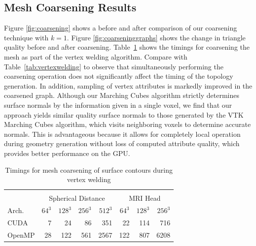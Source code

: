\documentclass[10pt,journal,cspaper,compsoc]{IEEEtran}
\begin{document}
\subsection{Mesh Coarsening Results}
Figure \ref{fig:coarsening} shows a before and after comparison of our coarsening technique with $k=1$. 
Figure \ref{fig:coarseninggraphs} shows the change in triangle quality before and after coarsening.
Table~\ref{tab:timingscoarsening} shows the timings for coarsening the mesh as part of the vertex welding algorithm. Compare with Table~\ref{tab:vertexwelding} to observe that simultaneously performing the coarsening operation does not significantly affect the timing of the topology generation. In addition, sampling of vertex attributes is markedly improved in the coarsened graph. Although our Marching Cubes algorithm strictly determines surface normals by the information given in a single voxel, we find that our approach yields similar quality surface normals to those generated by the VTK Marching Cubes algorithm, which visits neighboring voxels to determine accurate normals. This is advantageous because it allows for completely local operation during geometry generation without loss of computed attribute quality, which provides better performance on the GPU.

\begin{table}[htb!]
\begin{center}
\caption{Timings for mesh coarsening of surface contours during vertex welding}
\label{tab:timingscoarsening}
\begin{tabular}{l|r r r r|r r r}
\multicolumn{8}{c}{ } \\
 & \multicolumn{4}{|c|}{Spherical Distance} & \multicolumn{3}{|c}{MRI Head}\\
Arch. & $64^3$ & $128^3$ & $256^3$ & $512^3$ & $64^3$ & $128^3$ & $256^3$\\
\hline
CUDA & 7 & 24 & 86 & 351 & 22 & 114 & 716 \\
OpenMP & 28 & 122 & 561 & 2567 & 122 & 807 & 6208 \\
\end{tabular}
\end{center}
\end{table}
\end{document}
